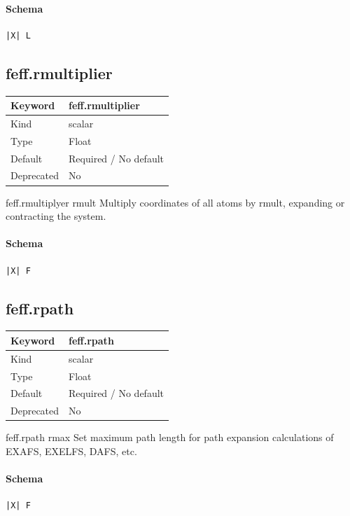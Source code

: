 \documentclass[11pt]{article}
\begin{document}
{{{{\paragraph{Schema}
\begin{Verbatim}
|X| L
\end{Verbatim}

\subsection{feff.rmultiplier}
\label{kw:feff-rmultiplier}
\begin{longtable}{|p{1.5in}|p{4.5in}|}
\hline
Keyword & feff.rmultiplier \\
\hline
Kind & scalar \\
\hline
Type & Float \\
\hline
Default & Required / No default \\
\hline
Deprecated & No \\
\hline
\end{longtable}
 feff.rmultiplyer{ rmult }
 Multiply coordinates of all atoms by rmult, expanding or contracting the
 system.

\paragraph{Schema}
\begin{Verbatim}
|X| F
\end{Verbatim}

\subsection{feff.rpath}
\label{kw:feff-rpath}
\begin{longtable}{|p{1.5in}|p{4.5in}|}
\hline
Keyword & feff.rpath \\
\hline
Kind & scalar \\
\hline
Type & Float \\
\hline
Default & Required / No default \\
\hline
Deprecated & No \\
\hline
\end{longtable}
 feff.rpath{ rmax }
 Set maximum path length for path expansion calculations of EXAFS, EXELFS,
 DAFS, etc.

\paragraph{Schema}
\begin{Verbatim}
|X| F
\end{Verbatim}

}}}}
\end{document}
